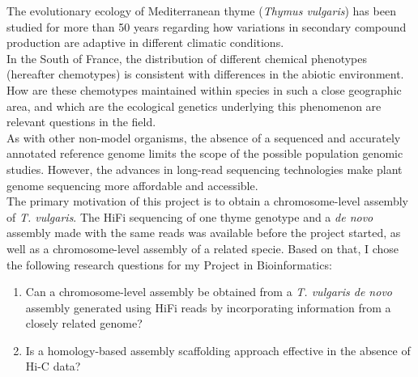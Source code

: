 The evolutionary ecology of Mediterranean thyme (\textit{Thymus vulgaris}) has been studied for more than 50 years regarding how variations in secondary compound production are adaptive in different climatic conditions.~\cite{thompsonPlantTraitsEcological2020}\\

In the South of France, the distribution of different chemical phenotypes (hereafter chemotypes) is consistent with differences in the abiotic environment. How are these chemotypes maintained within species in such a close geographic area, and which are the ecological genetics underlying this phenomenon are relevant questions in the field.~\cite{bataillonGenotypePhenotypeGenetic2022}\\

As with other non-model organisms, the absence of a sequenced and accurately annotated reference genome limits the scope of the possible population genomic studies. However, the advances in long-read sequencing technologies make plant genome sequencing more affordable and accessible.~\cite{puckerPlantGenomeSequence2022} \\

The primary motivation of this project is to obtain a chromosome-level assembly of \textit{T. vulgaris}. The \ac{HiFi} sequencing of one thyme genotype and a \textit{de novo} assembly made with the same reads was available before the project started, as well as a chromosome-level assembly of a related specie. Based on that, I chose the following research questions for my Project in Bioinformatics:

\begin{enumerate}
    \item Can a chromosome-level assembly be obtained from a \textit{T. vulgaris de novo} assembly generated using \ac{HiFi} reads by incorporating information from a closely related genome?
    \item Is a homology-based assembly scaffolding approach effective in the absence of \ac{Hi-C} data?
\end{enumerate}